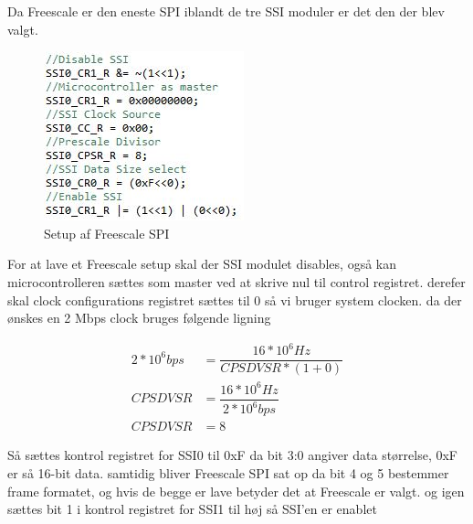 Da Freescale er den eneste SPI iblandt de tre SSI moduler er det den der blev valgt.

		\begin{figure}[h]
			\begin{center}
			\includegraphics[scale=0.8]{Billeder/Spi_Setup.jpg}
			\end{center}
			\label{fig:SPI_Setup}
			\caption{Setup af Freescale SPI}
		\end{figure}

For at lave et Freescale setup skal der SSI modulet disables, også kan microcontrolleren sættes som master ved at skrive nul til control registret.
derefer skal clock configurations registret sættes til 0 så vi bruger system clocken.
da der ønskes en 2 Mbps clock bruges følgende ligning

\begin{align*}
2*10^6 bps &= \dfrac{16*10^6 Hz}{CPSDVSR * (1 + 0)}\\
CPSDVSR &= \dfrac{16*10^6 Hz}{2*10^6 bps}\\
CPSDVSR &= 8
\end{align*}

Så sættes kontrol registret for SSI0 til 0xF da bit 3:0 angiver data størrelse, 0xF er så 16-bit data. samtidig bliver Freescale SPI sat op da bit 4 og 5 bestemmer frame formatet, og hvis de begge er lave betyder det at Freescale er valgt. 
og igen sættes bit 1 i kontrol registret for SSI1 til høj så SSI'en er enablet
